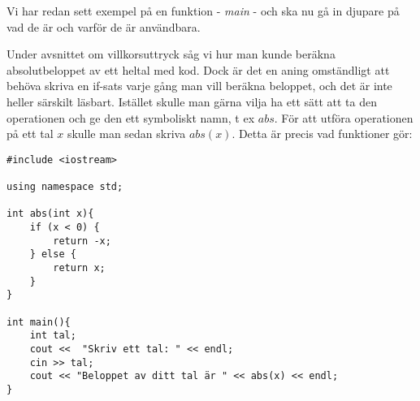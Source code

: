 Vi har redan sett exempel på en funktion - \emph{main} - och ska nu gå in djupare på vad de är och varför de är användbara.

Under avsnittet om villkorsuttryck såg vi hur man kunde beräkna absolutbeloppet av ett heltal med kod. Dock är det en aning omständligt att behöva skriva en if-sats varje gång man vill beräkna beloppet, och det är inte heller särskilt läsbart. Istället skulle man gärna vilja ha ett sätt att ta den operationen och ge den ett symboliskt namn, t ex $abs$. För att utföra operationen på ett tal $x$ skulle man sedan skriva $abs(x)$. Detta är precis vad funktioner gör:

\begin{lstlisting}
#include <iostream>

using namespace std;

int abs(int x){
	if (x < 0) {
		return -x;
	} else {
		return x;
	}
}

int main(){
	int tal;
	cout <<  "Skriv ett tal: " << endl;
	cin >> tal;
	cout << "Beloppet av ditt tal är " << abs(x) << endl;
}
\end{lstlisting}